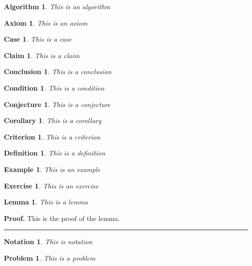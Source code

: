 \documentclass[letterpaper,12pt,openany,reqno]{book}%
\newtheorem{algorithm}[theorem]{Algorithm}
\newtheorem{axiom}[theorem]{Axiom}
\newtheorem{case}[theorem]{Case}
\newtheorem{claim}[theorem]{Claim}
\newtheorem{conclusion}[theorem]{Conclusion}
\newtheorem{condition}[theorem]{Condition}
\newtheorem{conjecture}[theorem]{Conjecture}
\newtheorem{corollary}[theorem]{Corollary}
\newtheorem{criterion}[theorem]{Criterion}
\newtheorem{definition}[theorem]{Definition}
\newtheorem{example}[theorem]{Example}
\newtheorem{exercise}[theorem]{Exercise}
\newtheorem{lemma}[theorem]{Lemma}
\newtheorem{notation}[theorem]{Notation}
\newtheorem{problem}[theorem]{Problem}
\newenvironment{proof}[1][Proof]{\textbf{#1.} }{\ \rule{0.5em}{0.5em}}
\begin{document}
\begin{algorithm}
This is an algorithm
\end{algorithm}

\begin{axiom}
This is an axiom
\end{axiom}

\begin{case}
This is a case
\end{case}

\begin{claim}
This is a claim
\end{claim}

\begin{conclusion}
This is a conclusion
\end{conclusion}

\begin{condition}
This is a condition
\end{condition}

\begin{conjecture}
This is a conjecture
\end{conjecture}

\begin{corollary}
This is a corollary
\end{corollary}

\begin{criterion}
This is a criterion
\end{criterion}

\begin{definition}
This is a definition
\end{definition}

\begin{example}
This is an example
\end{example}

\begin{exercise}
This is an exercise
\end{exercise}

\begin{lemma}
This is a lemma
\end{lemma}

\begin{proof}
This is the proof of the lemma.
\end{proof}

\begin{notation}
This is notation
\end{notation}

\begin{problem}
This is a problem
\end{problem}
\end{document}
